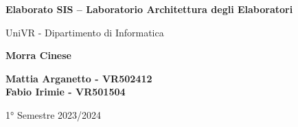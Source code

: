 \begin{titlepage}
	\begin{center}
		\vspace*{1cm}

		\Huge
		\textbf{Elaborato SIS – Laboratorio
			Architettura degli
			Elaboratori}

		\vspace{0.5cm}
		\LARGE
		UniVR - Dipartimento di Informatica

		\vspace{1cm}
		\huge
		\textbf{Morra Cinese}
		\vspace{1.5cm}


		\vfill


		\vspace{0.8cm}

		\Large
		\textbf{Mattia Arganetto - VR502412}\\
		\textbf{Fabio Irimie - VR501504}

		\vspace{0.5cm}

		1° Semestre 2023/2024

	\end{center}
\end{titlepage}
